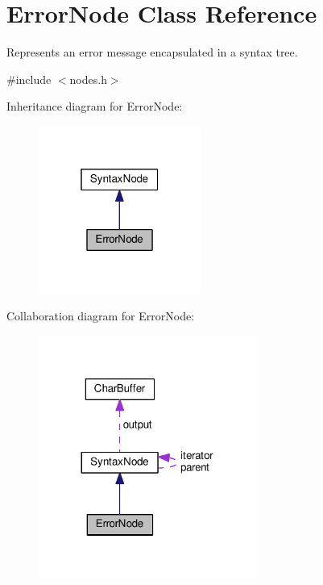 \hypertarget{classErrorNode}{}\section{Error\+Node Class Reference}
\label{classErrorNode}


Represents an error message encapsulated in a syntax tree.  




{\ttfamily \#include $<$nodes.\+h$>$}



Inheritance diagram for Error\+Node\+:\nopagebreak
\begin{figure}[H]
\begin{center}
\leavevmode
\includegraphics[width=151pt]{classErrorNode__inherit__graph}
\end{center}
\end{figure}


Collaboration diagram for Error\+Node\+:\nopagebreak
\begin{figure}[H]
\begin{center}
\leavevmode
\includegraphics[width=203pt]{classErrorNode__coll__graph}
\end{center}
\end{figure}
